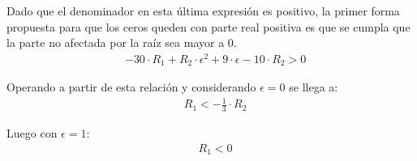 
Dado que el denominador en esta última expresión es positivo, la primer forma propuesta para que los ceros queden con parte real positiva es que se cumpla que la parte no 
afectada por la raíz sea mayor a 0.
\begin{align}
    &-30 \cdot R_1 + R_2 \cdot \epsilon^2 + 9 \cdot \epsilon - 10 \cdot R_2 > 0
    \label{eq:ej5_attempting_changing_zeros_with_real_part}
\end{align}

Operando a partir de esta relación y considerando $\epsilon = 0$ se llega a:
\begin{align}
    &R_1 < -\frac{1}{3} \cdot R_2
    \label{eq:ej5_results_of_attempting_changing_zeros_with_real_part_epsilon_0}
\end{align}

Luego con $\epsilon = 1$:
\begin{align}
    &R_1 < 0
    \label{eq:ej5_results_of_attempting_changing_zeros_with_real_part_epsilon_1}
\end{align}

